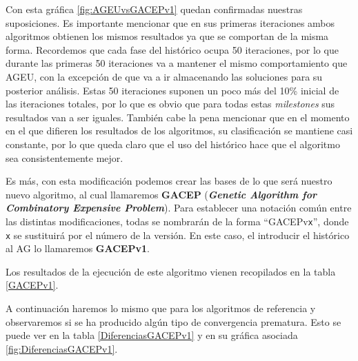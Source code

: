 Con esta gráfica \ref{fig:AGEUvsGACEPv1} quedan confirmadas nuestras suposiciones. 
Es importante mencionar que en sus primeras iteraciones ambos algoritmos obtienen los mismos resultados ya que se comportan de la misma forma. 
Recordemos que cada fase del histórico ocupa 50 iteraciones, por lo que durante las primeras 50 iteraciones va a mantener el mismo comportamiento que AGEU, con la excepción de que va a ir almacenando las soluciones para su posterior análisis. 
Estas 50 iteraciones suponen un poco más del 10\% inicial de las iteraciones totales, por lo que es obvio que para todas estas \textit{milestones} sus resultados van a ser iguales. 
También cabe la pena mencionar que en el momento en el que difieren los resultados de los algoritmos, su clasificación se mantiene casi constante, por lo que queda claro que el uso del histórico hace que el algoritmo sea consistentemente mejor.  

Es más, con esta modificación podemos crear las bases de lo que será nuestro nuevo algoritmo, al cual llamaremos \textbf{GACEP} (\textbf{\textit{Genetic Algorithm for Combinatory Expensive Problem}}). 
Para establecer una notación común entre las distintas modificaciones, todas se nombrarán de la forma ``GACEPv\texttt{x}'', donde \texttt{x} se sustituirá por el número de la versión. 
En este caso, el introducir el histórico al AG lo llamaremos \textbf{GACEPv1}.

Los resultados de la ejecución de este algoritmo vienen recopilados en la tabla \ref{GACEPv1}.

A continuación haremos lo mismo que para los algoritmos de referencia y observaremos si se ha producido algún tipo de convergencia prematura. 
Esto se puede ver en la tabla \ref{DiferenciasGACEPv1} y en su gráfica asociada \ref{fig:DiferenciasGACEPv1}.

